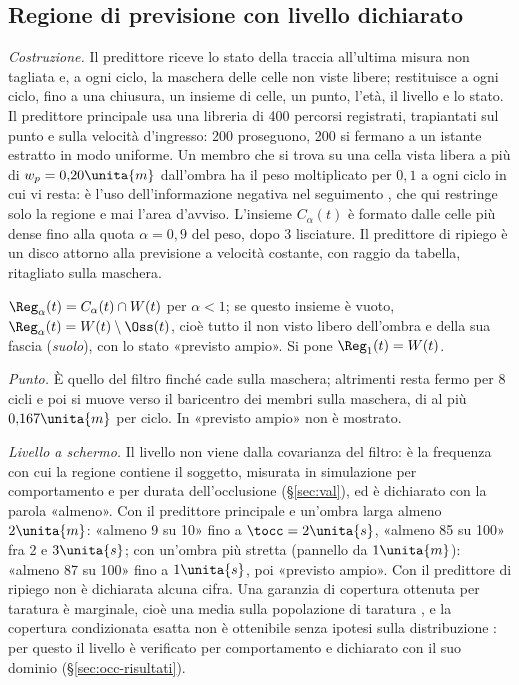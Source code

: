 \subsection{Regione di previsione con livello dichiarato}\label{sec:occ-regione}

\emph{Costruzione.} Il predittore riceve lo stato della traccia all'ultima misura non tagliata e, a ogni ciclo, la maschera delle celle non viste libere; restituisce a ogni ciclo, fino a una chiusura, un insieme di celle, un punto, l'età, il livello e lo stato. Il predittore principale usa una libreria di 400 percorsi registrati, trapiantati sul punto e sulla velocità d'ingresso: 200 proseguono, 200 si fermano a un istante estratto in modo uniforme. Un membro che si trova su una cella vista libera a più di $w_p=0{,}20\unita{m}$ dall'ombra ha il peso moltiplicato per $0{,}1$ a ogni ciclo in cui vi resta: è l'uso dell'informazione negativa nel seguimento \cite{koch2007,wyffels2015}, che qui restringe solo la regione e mai l'area d'avviso. L'insieme $C_\alpha(t)$ è formato dalle celle più dense fino alla quota $\alpha=0{,}9$ del peso, dopo 3 lisciature. Il predittore di ripiego è un disco attorno alla previsione a velocità costante, con raggio da tabella, ritagliato sulla maschera.

\begin{definizione}\label{def:occ-regione}
$\Reg_\alpha(t)=C_\alpha(t)\cap W(t)$ per $\alpha<1$; se questo insieme è vuoto, $\Reg_\alpha(t)=W(t)\setminus\Oss(t)$, cioè tutto il non visto libero dell'ombra e della sua fascia (\emph{suolo}), con lo stato «previsto ampio». Si pone $\Reg_1(t)=W(t)$.
\end{definizione}

\emph{Punto.} È quello del filtro finché cade sulla maschera; altrimenti resta fermo per 8 cicli e poi si muove verso il baricentro dei membri sulla maschera, di al più $0{,}167\unita{m}$ per ciclo. In «previsto ampio» non è mostrato.

\emph{Livello a schermo.} Il livello non viene dalla covarianza del filtro: è la frequenza con cui la regione contiene il soggetto, misurata in simulazione per comportamento e per durata dell'occlusione (\S\ref{sec:val}), ed è dichiarato con la parola «almeno». Con il predittore principale e un'ombra larga almeno $2\unita{m}$: «almeno 9 su 10» fino a $\tocc=2\unita{s}$, «almeno 85 su 100» fra 2 e $3\unita{s}$; con un'ombra più stretta (pannello da $1\unita{m}$): «almeno 87 su 100» fino a $1\unita{s}$, poi «previsto ampio». Con il predittore di ripiego non è dichiarata alcuna cifra. Una garanzia di copertura ottenuta per taratura è marginale, cioè una media sulla popolazione di taratura \cite{angelopoulos2021}, e la copertura condizionata esatta non è ottenibile senza ipotesi sulla distribuzione \cite{barber2019}: per questo il livello è verificato per comportamento e dichiarato con il suo dominio (\S\ref{sec:occ-risultati}).

